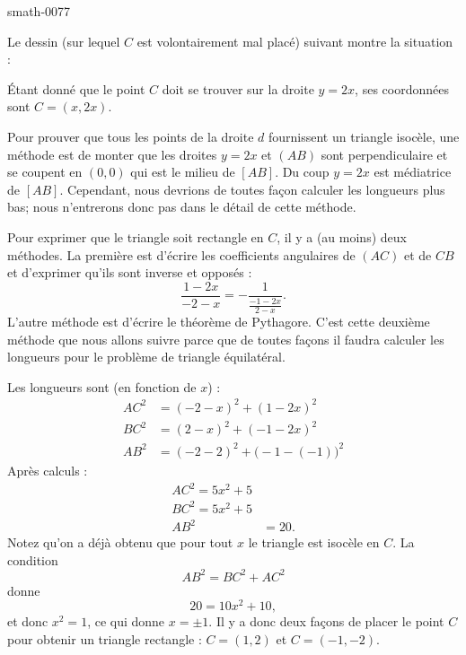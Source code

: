 
\begin{corrige}{smath-0077}

Le dessin (sur lequel \( C\) est volontairement mal placé) suivant montre la situation :
\begin{center}

\end{center}
Étant donné que le point \( C\) doit se trouver sur la droite \( y=2x\), ses coordonnées sont \( C=(x,2x)\).

Pour prouver que tous les points de la droite \( d\) fournissent un triangle isocèle, une méthode est de monter que les droites \( y=2x\) et \( (AB)\) sont perpendiculaire et se coupent en \( (0,0)\) qui est le milieu de \( [AB]\). Du coup \( y=2x\) est médiatrice de \( [AB]\). Cependant, nous devrions de toutes façon calculer les longueurs plus bas; nous n'entrerons donc pas dans le détail de cette méthode.

Pour exprimer que le triangle soit rectangle en \( C\), il y a (au moins) deux méthodes. La première est d'écrire les coefficients angulaires de \( (AC)\) et de \( CB\) et d'exprimer qu'ils sont inverse et opposés :
\begin{equation}
    \frac{ 1-2x }{ -2-x }=-\frac{1}{ \frac{ -1-2x }{ 2-x } }.
\end{equation}
L'autre méthode est d'écrire le théorème de Pythagore. C'est cette deuxième méthode que nous allons suivre parce que de toutes façons il faudra calculer les longueurs pour le problème de triangle équilatéral.

Les longueurs sont (en fonction de \( x\)) :
\begin{subequations}
    \begin{align}
        AC^2&=(-2-x)^2+(1-2x)^2\\
        BC^2&=(2-x)^2+(-1-2x)^2\\
        AB^2&=(-2-2)^2+\big(-1-(-1)\big)^2
    \end{align}
\end{subequations}
Après calculs :
\begin{subequations}
    \begin{align}
        AC^2=5x^2+5\\
        BC^2=5x^2+5\\
        AB^2&=20.
    \end{align}
\end{subequations}
Notez qu'on a déjà obtenu que pour tout \( x\) le triangle est isocèle en \( C\). La condition
\begin{equation}
    AB^2=BC^2+AC^2
\end{equation}
donne
\begin{equation}
    20=10x^2+10,
\end{equation}
et donc \( x^2=1\), ce qui donne \( x=\pm 1\). Il y a donc deux façons de placer le point \( C\) pour obtenir un triangle rectangle : \( C=(1,2)\) et \( C=(-1,-2)\).


\end{corrige}
